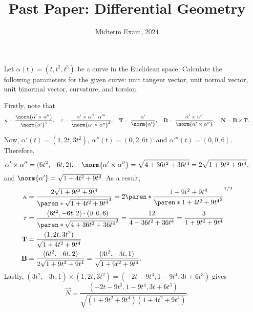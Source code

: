 \documentclass[11pt]{penrose}
\title{Past Paper: Differential Geometry}
\subtitle{Midterm Exam, 2024}
\begin{document}
\maketitle
\warningtext

\begin{problem}{1}
    Let $\alpha(t) = (t, t^2, t^3)$ be a curve in the Euclidean space. Calculate the following parameters for the given curve: unit tangent vector, unit normal vector, unit binormal vector, curvature, and torsion.

    \solution Firstly, note that
    \begin{equation*}
        \kappa = \frac{\norm{\alpha' \times \alpha''}}{\norm{\alpha'}^3},\quad
        \tau = \frac{\alpha' \times \alpha'' \cdot \alpha'''}{\norm{\alpha' \times \alpha''}^2},\quad
        \vec{T} = \frac{\alpha'}{\norm{\alpha'}},\quad
        \vec{B} = \frac{\alpha' \times \alpha''}{\norm{\alpha' \times \alpha''}},\quad
        \vec{N} = \vec{B} \times \vec{T}.
    \end{equation*}

    Now, $\alpha'(t) = (1, 2t, 3t^2)$, $\alpha''(t) = (0, 2, 6t)$ and $\alpha'''(t) = (0, 0, 6)$. Therefore,
    \begin{equation*}
        \alpha' \times \alpha'' = (6t^2, -6t, 2),\quad
        \norm{\alpha' \times \alpha''} = \sqrt{4 + 36t^2 + 36t^4} = 2\sqrt{1 + 9t^2 + 9t^4},
    \end{equation*}
    and $\norm{\alpha'} = \sqrt{1 + 4t^2 + 9t^4}$. As a result,
    \begin{align*}
        \kappa &= \frac{2\sqrt{1 + 9t^2 + 9t^4}}{\paren*{\sqrt{1 + 4t^2 + 9t^4}}^3} = 2 \paren*{\frac{1 + 9t^2 + 9t^4}{\paren*{1 + 4t^2 + 9t^4}^3}}^{1/2}\\
        \tau &= \frac{(6t^2, -6t, 2) \cdot (0,0,6)}{\paren*{\sqrt{4 + 36t^2 + 36t^4}}^2} = \frac{12}{4 + 36t^2 + 36t^4} = \frac{3}{1 + 9t^2 + 9t^4}\\
        \vec{T} &= \frac{(1, 2t, 3t^2)}{\sqrt{1 + 4t^2 + 9t^4}}\\
        \vec{B} &= \frac{(6t^2, -6t, 2)}{2\sqrt{1 + 9t^2 + 9t^4}} = \frac{(3t^2, -3t, 1)}{\sqrt{1 + 9t^2 + 9t^4}}.
    \end{align*}
    Lastly, $(3t^2, -3t, 1) \times (1, 2t, 3t^2) = (-2t-9t^3, 1-9t^4, 3t+6t^3)$ gives
    \begin{equation*}
        \vec{N} = \frac{(-2t-9t^3, 1-9t^4, 3t+6t^3)}{\sqrt{(1 + 9t^2 + 9t^4) (1 + 4t^2 + 9t^4)}}.
    \end{equation*}
\end{problem}
\end{document}

